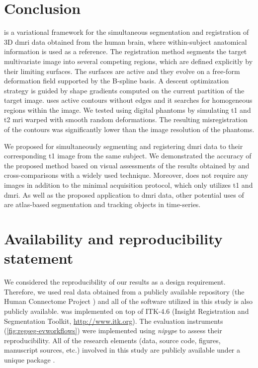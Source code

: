 \section*{Conclusion}
\label{sec:regseg-conclusion}

\Regseg{} is a variational framework for the simultaneous segmentation and
  registration of 3D \gls*{dmri} data obtained from the human brain, where within-subject
  anatomical information is used as a reference.
The registration method segments the target multivariate image into several competing regions, which are
  defined explicitly by their limiting surfaces.
The surfaces are active and they evolve on a free-form deformation field supported by the B-spline basis.
A descent optimization strategy is guided by shape gradients computed on the current partition
  of the target image.
\Regseg{} uses active contours without edges and it searches for
  homogeneous regions within the image.
We tested \regseg{} using digital phantoms by simulating \gls*{t1} and \gls*{t2} \gls*{mri}
  warped with smooth random deformations.
The resulting misregistration of the contours was significantly lower than the image resolution
  of the phantoms.

We proposed \regseg{} for simultaneously segmenting and registering \gls*{dmri} data to
  their corresponding \gls*{t1} image from the same subject.
We demonstrated the accuracy of the proposed method based on visual assessments of the results
  obtained by \regseg{} and cross-comparisons with a widely used technique.
Moreover, \regseg{} does not require any images in addition to the minimal acquisition protocol,
  which only utilizes \gls*{t1} and \gls*{dmri}.
As well as the proposed application to \gls*{dmri} data, other potential uses of \regseg{} are
  atlas-based segmentation and tracking objects in time-series.


\section*{Availability and reproducibility statement}
\label{sec:regseg-availability}
We considered the reproducibility of our results as a design requirement.
Therefore, we used real data obtained from a publicly available repository
  (the Human Connectome Project \citep{essen_human_2012}) and all of the software
  utilized in this study is also publicly available.
\Regseg{} was implemented on top of ITK-4.6 (Insight Registration and 
  Segmentation Toolkit, \url{http://www.itk.org}).
The evaluation instruments (\autoref{fig:regseg-evworkflows}) were implemented using
  \emph{nipype} \citep{gorgolewski_nipype_2011} to assess their reproducibility.
All of the research elements (data, source code, figures, manuscript sources, etc.) involved in this study
  are publicly available under a unique package \citep{esteban_acweregistration_2015}. 